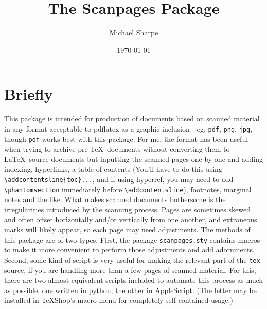 \documentclass[11pt]{article}
\title{The \textsf{Scanpages} Package}
\author{Michael Sharpe}
\date{\today}  %
\begin{document}
\maketitle
\section{Briefly}
This package is intended for production of documents based on scanned material in any format acceptable to \textsf{pdflatex} as a graphic inclusion---eg, {\tt pdf}, {\tt png}, {\tt jpg}, though {\tt pdf} works best with this package. For me, the format has been useful when trying to archive pre-\TeX\ documents without converting them to \LaTeX\ source documents but inputting the scanned pages one by one and adding indexing, hyperlinks, a table of contents (You'll have to do this using \verb|\addcontentsline{toc}...|, and if using \textsf{hyperref}, you may need to add \verb|\phantomsection| immediately before \verb|\addcontentsline|), footnotes, marginal notes and the like. What makes scanned documents bothersome is the irregularities introduced by the scanning process. Pages are sometimes skewed and often offset horizontally and/or  vertically from one another, and extraneous marks will likely appear, so each page may need adjustments. The methods of this package are of two types. First, the package {\tt scanpages.sty} contains macros to make it more convenient to perform those adjustments and add adornments. Second, some kind of script is very useful for making the relevant part of the {\tt tex} source, if you are handling more than a few pages of scanned material. For this, there are two almost equivalent scripts included to automate this process as much as possible, one written in \textsf{python}, the other in \textsf{AppleScript.} (The letter may be installed in \TeX Shop's macro menu for completely self-contained usage.)
\end{document}
